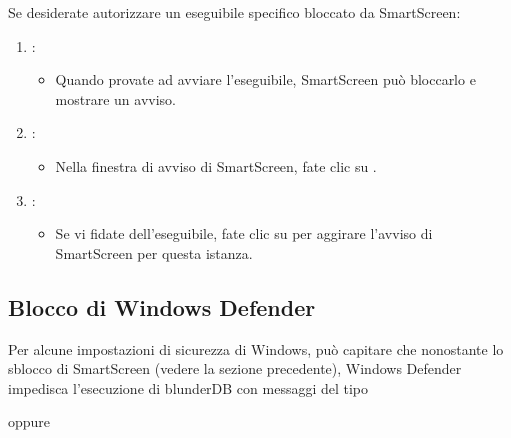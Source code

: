 \documentclass[letterpaper,10pt,italian]{sphinxmanual}
\begin{document}
\sphinxAtStartPar
Se desiderate autorizzare un eseguibile specifico bloccato da SmartScreen:
\begin{enumerate}
%
\item {} 
\sphinxAtStartPar
{}:
\begin{itemize}
\item {} 
\sphinxAtStartPar
Quando provate ad avviare l’eseguibile, SmartScreen può bloccarlo e mostrare un avviso.

\end{itemize}

\item {} 
\sphinxAtStartPar
{}:
\begin{itemize}
\item {} 
\sphinxAtStartPar
Nella finestra di avviso di SmartScreen, fate clic su .

\end{itemize}

\item {} 
\sphinxAtStartPar
{}:
\begin{itemize}
\item {} 
\sphinxAtStartPar
Se vi fidate dell’eseguibile, fate clic su  per aggirare l’avviso di SmartScreen per questa istanza.

\end{itemize}

\end{enumerate}


\subsection{Blocco di Windows Defender}
\label{\detokenize{annexe_windows_securite:blocage-windows-defender}}
\sphinxAtStartPar
Per alcune impostazioni di sicurezza di Windows, può capitare che nonostante lo sblocco di SmartScreen (vedere la sezione precedente), Windows Defender impedisca l’esecuzione di blunderDB con messaggi del tipo

\begin{figure}[htbp]
\centering

\noindent{}
\end{figure}

\sphinxAtStartPar
oppure
\end{document}
